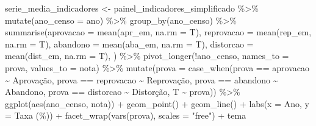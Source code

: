 \documentclass[
  letterpaper,
  DIV=11,
  numbers=noendperiod]{scrartcl}
\newenvironment{Shaded}{\begin{snugshade}}{\end{snugshade}}
\newcommand{\AttributeTok}[1]{\textcolor[rgb]{0.40,0.45,0.13}{#1}}
\newcommand{\FunctionTok}[1]{\textcolor[rgb]{0.28,0.35,0.67}{#1}}
\newcommand{\NormalTok}[1]{\textcolor[rgb]{0.00,0.23,0.31}{#1}}
\newcommand{\OtherTok}[1]{\textcolor[rgb]{0.00,0.23,0.31}{#1}}
\newcommand{\SpecialCharTok}[1]{\textcolor[rgb]{0.37,0.37,0.37}{#1}}
\newcommand{\StringTok}[1]{\textcolor[rgb]{0.13,0.47,0.30}{#1}}
\begin{document}
\begin{Shaded}
\begin{Highlighting}[]
\NormalTok{serie\_media\_indicadores }\OtherTok{\textless{}{-}} 
\NormalTok{  painel\_indicadores\_simplificado }\SpecialCharTok{\%\textgreater{}\%} 
    \FunctionTok{mutate}\NormalTok{(}\AttributeTok{ano\_censo =}\NormalTok{ ano) }\SpecialCharTok{\%\textgreater{}\%} 
    \FunctionTok{group\_by}\NormalTok{(ano\_censo) }\SpecialCharTok{\%\textgreater{}\%} 
     \FunctionTok{summarise}\NormalTok{(}\AttributeTok{aprovacao =} \FunctionTok{mean}\NormalTok{(apr\_em, }\AttributeTok{na.rm =}\NormalTok{ T),}
              \AttributeTok{reprovacao =} \FunctionTok{mean}\NormalTok{(rep\_em, }\AttributeTok{na.rm =}\NormalTok{ T),}
              \AttributeTok{abandono =} \FunctionTok{mean}\NormalTok{(aba\_em, }\AttributeTok{na.rm =}\NormalTok{ T),}
              \AttributeTok{distorcao =} \FunctionTok{mean}\NormalTok{(dist\_em, }\AttributeTok{na.rm =}\NormalTok{ T),}
\NormalTok{              ) }\SpecialCharTok{\%\textgreater{}\%}
  \FunctionTok{pivot\_longer}\NormalTok{(}\SpecialCharTok{!}\NormalTok{ano\_censo, }
               \AttributeTok{names\_to =} \StringTok{\textquotesingle{}prova\textquotesingle{}}\NormalTok{,}
               \AttributeTok{values\_to =} \StringTok{\textquotesingle{}nota\textquotesingle{}}\NormalTok{) }\SpecialCharTok{\%\textgreater{}\%} 
  \FunctionTok{mutate}\NormalTok{(}\AttributeTok{prova =} \FunctionTok{case\_when}\NormalTok{(prova }\SpecialCharTok{==} \StringTok{\textquotesingle{}aprovacao\textquotesingle{}} \SpecialCharTok{\textasciitilde{}} \StringTok{\textquotesingle{}Aprovação\textquotesingle{}}\NormalTok{,}
\NormalTok{                           prova }\SpecialCharTok{==} \StringTok{\textquotesingle{}reprovacao\textquotesingle{}} \SpecialCharTok{\textasciitilde{}} \StringTok{\textquotesingle{}Reprovação\textquotesingle{}}\NormalTok{,}
\NormalTok{                           prova }\SpecialCharTok{==} \StringTok{\textquotesingle{}abandono\textquotesingle{}} \SpecialCharTok{\textasciitilde{}} \StringTok{\textquotesingle{}Abandono\textquotesingle{}}\NormalTok{,}
\NormalTok{                           prova }\SpecialCharTok{==} \StringTok{\textquotesingle{}distorcao\textquotesingle{}} \SpecialCharTok{\textasciitilde{}} \StringTok{\textquotesingle{}Distorção\textquotesingle{}}\NormalTok{,}
\NormalTok{                           T }\SpecialCharTok{\textasciitilde{}}\NormalTok{ prova)) }\SpecialCharTok{\%\textgreater{}\%} 
  \FunctionTok{ggplot}\NormalTok{(}\FunctionTok{aes}\NormalTok{(ano\_censo, nota)) }\SpecialCharTok{+}
  \FunctionTok{geom\_point}\NormalTok{() }\SpecialCharTok{+}
  \FunctionTok{geom\_line}\NormalTok{() }\SpecialCharTok{+} 
  \FunctionTok{labs}\NormalTok{(}\AttributeTok{x =} \StringTok{\textquotesingle{}Ano\textquotesingle{}}\NormalTok{, }\AttributeTok{y =} \StringTok{\textquotesingle{}Taxa (\%)\textquotesingle{}}\NormalTok{) }\SpecialCharTok{+}
  \FunctionTok{facet\_wrap}\NormalTok{(}\FunctionTok{vars}\NormalTok{(prova), }\AttributeTok{scales =} \StringTok{"free"}\NormalTok{) }\SpecialCharTok{+}
\NormalTok{  tema}


\end{Highlighting}
\end{Shaded}
\end{document}
